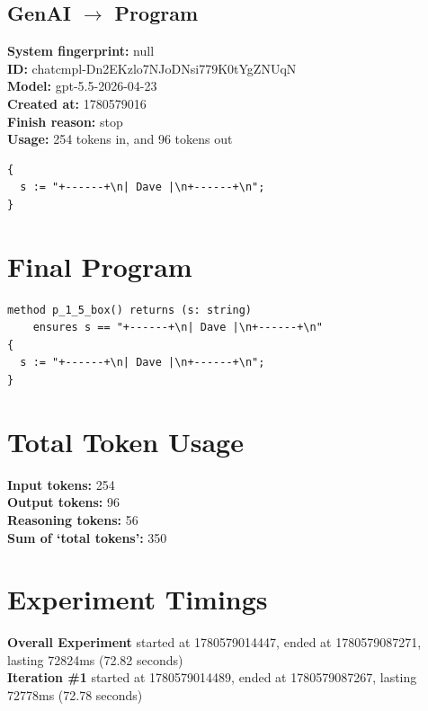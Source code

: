 \documentclass{article}
\begin{document}
\subsection*{GenAI $\rightarrow$ Program}
\textbf{System fingerprint: }null
\\\textbf{ID: }chatcmpl-Dn2EKzlo7NJoDNsi779K0tYgZNUqN
\\\textbf{Model: }gpt-5.5-2026-04-23
\\\textbf{Created at: }1780579016
\\\textbf{Finish reason: }stop
\\\textbf{Usage: }254 tokens in, and 96 tokens out
\begin{lstlisting}
{
  s := "+------+\n| Dave |\n+------+\n";
}
\end{lstlisting}
\section*{Final Program}
\begin{lstlisting}
method p_1_5_box() returns (s: string)
	ensures s == "+------+\n| Dave |\n+------+\n"
{
  s := "+------+\n| Dave |\n+------+\n";
}
\end{lstlisting}
\section*{Total Token Usage}
\textbf{Input tokens: }254
\\\textbf{Output tokens: }96
\\\textbf{Reasoning tokens: }56
\\\textbf{Sum of `total tokens': }350
\section*{Experiment Timings}
\textbf{Overall Experiment} started at 1780579014447, ended at 1780579087271, lasting 72824ms (72.82 seconds)
\\\textbf{Iteration \#1} started at 1780579014489, ended at 1780579087267, lasting 72778ms (72.78 seconds)
\end{document}
